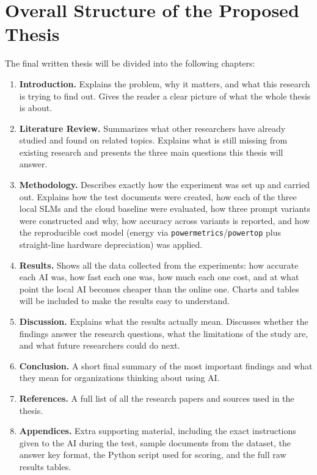 \section{Overall Structure of the Proposed Thesis}
\label{sec:structure}

The final written thesis will be divided into the following chapters:

\begin{enumerate}
    \item \textbf{Introduction.} Explains the problem, why it matters, and what this research is trying to find out. Gives the reader a clear picture of what the whole thesis is about.

    \item \textbf{Literature Review.} Summarizes what other researchers have already studied and found on related topics. Explains what is still missing from existing research and presents the three main questions this thesis will answer.

    \item \textbf{Methodology.} Describes exactly how the experiment was set up and carried out. Explains how the test documents were created, how each of the three local SLMs and the cloud baseline were evaluated, how three prompt variants were constructed and why, how accuracy across variants is reported, and how the reproducible cost model (energy via \texttt{powermetrics}/\texttt{powertop} plus straight-line hardware depreciation) was applied.

    \item \textbf{Results.} Shows all the data collected from the experiments: how accurate each AI was, how fast each one was, how much each one cost, and at what point the local AI becomes cheaper than the online one. Charts and tables will be included to make the results easy to understand.

    \item \textbf{Discussion.} Explains what the results actually mean. Discusses whether the findings answer the research questions, what the limitations of the study are, and what future researchers could do next.

    \item \textbf{Conclusion.} A short final summary of the most important findings and what they mean for organizations thinking about using AI.

    \item \textbf{References.} A full list of all the research papers and sources used in the thesis.

    \item \textbf{Appendices.} Extra supporting material, including the exact instructions given to the AI during the test, sample documents from the dataset, the answer key format, the Python script used for scoring, and the full raw results tables.
\end{enumerate}
